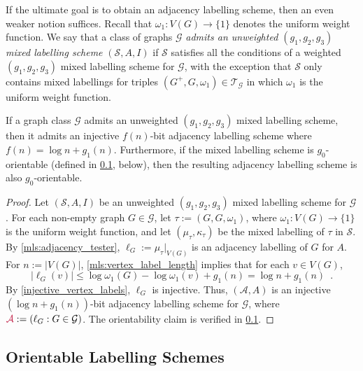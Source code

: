 \documentclass{patmorin}
\makeatletter
\renewcommand{\le}{\leqslant}
\newcommand{\defin}[1]{\emph{\textcolor{brightmaroon}{#1}}}
\def\mathcolor#1#{\@mathcolor{#1}}
\def\@mathcolor#1#2#3{%
  \protect\leavevmode
  \begingroup
    \color#1{#2}#3%
  \endgroup
}
\newcommand{\mathdefin}[1]{\mathcolor{brightmaroon}{#1}}
\newcommand{\calA}{\mathcal{A}}
\newcommand{\calG}{\mathcal{G}}
\newcommand{\calS}{\mathcal{S}}
\newcommand{\calT}{\mathcal{T}}
\makeatother
\begin{document}
If the ultimate goal is to obtain an adjacency labelling scheme, then an even weaker notion suffices. Recall that $\omega_1:V(G)\to\{1\}$ denotes the uniform weight function. We say that a class of graphs $\calG$ \defin{admits an unweighted $(g_1,g_2,g_3)$ mixed labelling scheme} $(\calS,A,I)$ if $\calS$ satisfies all the conditions of a weighted $(g_1,g_2,g_3)$ mixed labelling scheme for $\calG$, with the exception that $\calS$ only contains mixed labellings for triples $(G^+,G,\omega_1)\in\calT_\calG$ in which $\omega_1$ is the uniform weight function.

\begin{obs}\label{adj_labelling_from_mixed_labelling}
  If a graph class $\calG$ admits an unweighted $(g_1,g_2,g_3)$ mixed labelling scheme, then it admits an injective $f(n)$-bit adjacency labelling scheme where $f(n)=\log n+g_1(n)$. Furthermore, if the mixed labelling scheme is $g_0$-orientable (defined in \cref{sec:orientable}, below), then the resulting adjacency labelling scheme is also $g_0$-orientable.
\end{obs}
\begin{proof}
  Let $(\calS,A,I)$ be an unweighted $(g_1,g_2,g_3)$ mixed labelling scheme for $\calG$. For each non-empty graph $G\in\calG$, let $\tau := (G, G, \omega_1)$, where $\omega_1:V(G)\to\{1\}$ is the uniform weight function, and let $(\mu_\tau,\kappa_\tau)$ be the mixed labelling of $\tau$ in $\calS$. By \ref{mls:adjacency_tester}, $\ell_G := \mu_{\tau}|_{V(G)}$ is an adjacency labelling of $G$ for $A$. For $n:=|V(G)|$, \ref{mls:vertex_label_length} implies that for each $v\in V(G)$,
  \[
    |\ell_G(v)| \le \log\omega_1(G) - \log\omega_1(v) + g_1(n) = \log n + g_1(n) \enspace.
  \]
  By \cref{injective_vertex_labels}, $\ell_G$ is injective. Thus, $(\calA, A)$ is an injective $(\log n + g_1(n))$-bit adjacency labelling scheme for $\calG$, where $\mathdefin{\calA} := (\ell_G : G\in\calG)$. The orientability claim is verified in \cref{sec:orientable}.
\end{proof}


\subsection{Orientable Labelling Schemes}\label{sec:orientable}
\end{document}
